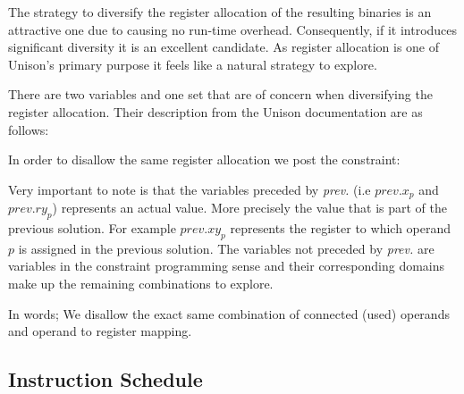 The strategy to diversify the register allocation of the resulting binaries is an attractive
one due to causing no run-time overhead. Consequently, if it introduces significant diversity
it is an excellent candidate. As register allocation is one of Unison's primary purpose it
feels like a natural strategy to explore.

There are two variables and one set that are of concern when diversifying the register
allocation. Their description from the Unison documentation are as follows:

\vspace{0.2cm}

\noindent{}

\vspace{0.2cm}

In order to disallow the same register allocation we post the constraint:

\vspace{0.2cm}
\noindent{}
\vspace{0.2cm}

Very important to note is that the variables preceded by \textit{prev.} (i.e $prev.x_p$ and
$prev.ry_p$) represents an actual value. More precisely the value that is part of the previous
solution. For example $prev.xy_p$ represents the register to which operand $p$ is assigned
in the previous solution. The variables not preceded by \textit{prev.} are variables in
the constraint programming sense and their corresponding domains make up the remaining
combinations to explore.

In words; We disallow the exact same combination of connected (used) operands and
operand to register mapping.

\subsection{Instruction Schedule}

